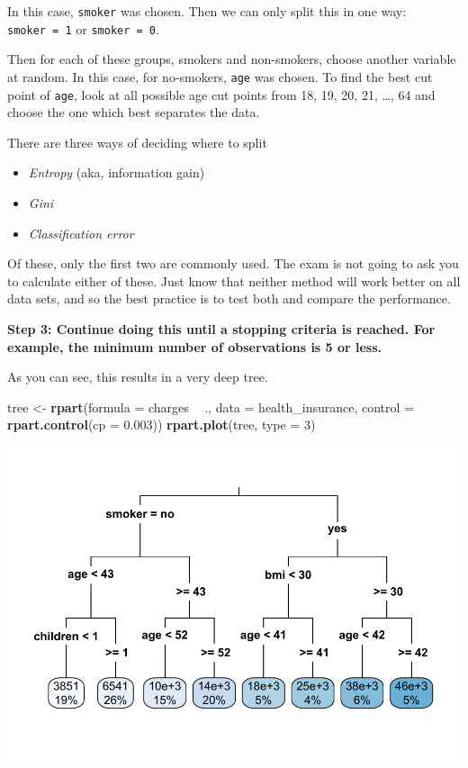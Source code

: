 \documentclass[
  openany]{book}
\newenvironment{Shaded}{\begin{snugshade}}{\end{snugshade}}
\newcommand{\DataTypeTok}[1]{\textcolor[rgb]{0.13,0.29,0.53}{#1}}
\newcommand{\DecValTok}[1]{\textcolor[rgb]{0.00,0.00,0.81}{#1}}
\newcommand{\FloatTok}[1]{\textcolor[rgb]{0.00,0.00,0.81}{#1}}
\newcommand{\KeywordTok}[1]{\textcolor[rgb]{0.13,0.29,0.53}{\textbf{#1}}}
\newcommand{\NormalTok}[1]{#1}
\newcommand{\OperatorTok}[1]{\textcolor[rgb]{0.81,0.36,0.00}{\textbf{#1}}}
\newcommand{\StringTok}[1]{\textcolor[rgb]{0.31,0.60,0.02}{#1}}
\providecommand{\tightlist}{%
  \setlength{\itemsep}{0pt}\setlength{\parskip}{0pt}}
\begin{document}
In this case, \texttt{smoker} was chosen. Then we can only split this in one way: \texttt{smoker\ =\ 1} or \texttt{smoker\ =\ 0}.

Then for each of these groups, smokers and non-smokers, choose another variable at random. In this case, for no-smokers, \texttt{age} was chosen. To find the best cut point of \texttt{age}, look at all possible age cut points from 18, 19, 20, 21, \ldots, 64 and choose the one which best separates the data.

There are three ways of deciding where to split

\begin{itemize}
\tightlist
\item
  \emph{Entropy} (aka, information gain)
\item
  \emph{Gini}
\item
  \emph{Classification error}
\end{itemize}

Of these, only the first two are commonly used. The exam is not going to ask you to calculate either of these. Just know that neither method will work better on all data sets, and so the best practice is to test both and compare the performance.

\textbf{Step 3: Continue doing this until a stopping criteria is reached. For example, the minimum number of observations is 5 or less.}

As you can see, this results in a very deep tree.

\begin{Shaded}
\begin{Highlighting}[]
\NormalTok{tree <-}\StringTok{ }\KeywordTok{rpart}\NormalTok{(}\DataTypeTok{formula =}\NormalTok{ charges }\OperatorTok{~}\StringTok{  }\NormalTok{., }\DataTypeTok{data =}\NormalTok{ health_insurance,}
              \DataTypeTok{control =} \KeywordTok{rpart.control}\NormalTok{(}\DataTypeTok{cp =} \FloatTok{0.003}\NormalTok{))}
\KeywordTok{rpart.plot}\NormalTok{(tree, }\DataTypeTok{type =} \DecValTok{3}\NormalTok{)}
\end{Highlighting}
\end{Shaded}

\includegraphics{06-tree-based-models_files/figure-latex/unnamed-chunk-4-1.pdf}
\end{document}
